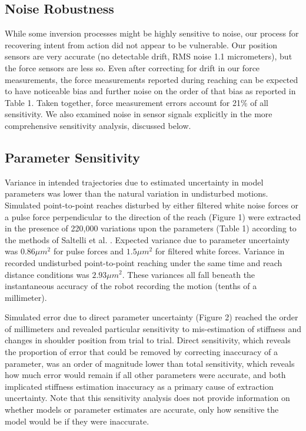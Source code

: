 \documentclass[10pt]{article}
\begin{document}
\subsection*{Noise Robustness}
While some inversion processes might be highly sensitive to noise, our process for recovering intent from action did not appear to be vulnerable. Our position sensors are very accurate (no detectable drift, RMS noise 1.1 micrometers), but the force sensors are less so. Even after correcting for drift in our force measurements, the force measurements reported during reaching can be expected to have noticeable bias and further noise on the order of that bias as reported in Table 1. Taken together, force measurement errors account for 21\% of all sensitivity. We also examined noise in sensor signals explicitly in the more comprehensive  sensitivity analysis, discussed below.

\subsection*{Parameter Sensitivity}
Variance in intended trajectories due to estimated uncertainty in model parameters was lower than the natural variation in undisturbed motions. Simulated point-to-point reaches disturbed by either filtered white noise forces or a pulse force perpendicular to the direction of the reach (Figure 1) were extracted in the presence of 220,000 variations upon the parameters (Table 1) according to the methods of Saltelli et al. \cite{saltelli2010variance}. Expected variance due to parameter uncertainty was $0.86  \mu m^2$ for pulse forces and $1.5 \mu m^2$ for filtered white forces. Variance in recorded undisturbed point-to-point reaching under the same time and reach distance conditions was $2.93 \mu m^2$. These variances all fall beneath the instantaneous accuracy of the robot recording the motion (tenths of a millimeter).

Simulated error due to direct parameter uncertainty (Figure 2) reached the order of millimeters and revealed particular sensitivity to mis-estimation of stiffness and changes in shoulder position from trial to trial. Direct sensitivity, which reveals the proportion of error that could be removed by correcting inaccuracy of a parameter, was an order of magnitude lower than total sensitivity, which reveals how much error would remain if all other parameters were accurate,  and both implicated stiffness estimation inaccuracy as a primary cause of extraction uncertainty. Note that this sensitivity analysis does not provide information on whether models or parameter estimates are accurate, only how sensitive the model would be if they were inaccurate. 
\end{document}
